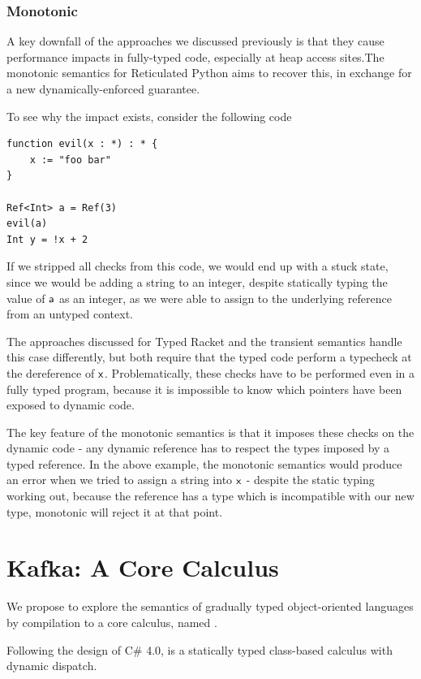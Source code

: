 \documentclass[a4paper,USenglish]{tex/lipics-v2016}
\begin{document}
\subsubsection{Monotonic}
A key downfall of the approaches we discussed previously is that they
cause performance impacts in fully-typed code, especially at heap access
sites.The monotonic semantics for Reticulated Python aims to recover this,
in exchange for a new dynamically-enforced guarantee.

To see why the impact exists, consider the following code

\begin{verbatim}
function evil(x : *) : * {
	x := "foo bar"
}

Ref<Int> a = Ref(3)
evil(a)
Int y = !x + 2
\end{verbatim}

If we stripped all checks from this code, we would end up with a stuck
state, since we would be adding a string to an integer, despite statically
typing the value of ${\sf{a}}$ as an integer, as we were able to assign to the
underlying reference from an untyped context.

The approaches discussed for Typed Racket and the transient semantics
handle this case differently, but both require that the typed code perform
a typecheck at the dereference of ${\sf{x}}$. Problematically, these checks
have to be performed even in a fully typed program, because it is impossible
to know which pointers have been exposed to dynamic code.

The key feature of the monotonic semantics is that it imposes these checks
on the dynamic code - any dynamic reference has to respect the types imposed
by a typed reference. In the above example, the monotonic semantics would
produce an error when we tried to assign a string into ${\sf{x}}$ - despite the
static typing working out, because the reference has a type which is
incompatible with our new type, monotonic will reject it at that point.

\section{Kafka: A Core Calculus}

We propose to explore the semantics of gradually typed object-oriented
languages by compilation to a core calculus, named \kafka.

Following the design of C\# 4.0, \kafka is a statically typed class-based
calculus with dynamic dispatch.
\end{document}

